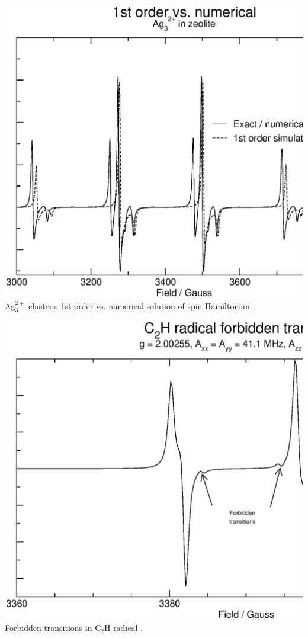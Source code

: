 \documentclass[byrevtex,amssymb,aps,pra,floatfix,letterpaper]{revtex4}
\begin{document}
\begin{center}
\includegraphics*[scale=0.3]{fig12}\\
Ag$_3^{2+}$ clusters: 1st order vs. numerical solution of spin Hamiltonian \cite{lund}.
\end{center}

\begin{center}
\includegraphics*[scale=0.25]{fig13}\\
Forbidden transitions in C$_2$H radical \cite{weltner}.
\end{center}
\end{document}
